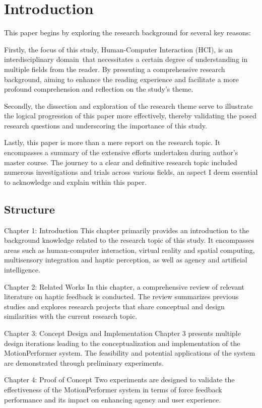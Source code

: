 \chapter{Introduction}
This paper begins by exploring the research background for several key reasons:

Firstly, the focus of this study, Human-Computer Interaction (HCI), is an interdisciplinary domain\cite{paper1}\cite{paper2}\ that necessitates a certain degree of understanding in multiple fields from the reader. By presenting a comprehensive research background, aiming to enhance the reading experience and facilitate a more profound comprehension and reflection on the study's theme.

Secondly, the dissection and exploration of the research theme serve to illustrate the logical progression of this paper more effectively, thereby validating the posed research questions and underscoring the importance of this study.

Lastly, this paper is more than a mere report on the research topic. It encompasses a summary of the extensive efforts undertaken during author's master course. The journey to a clear and definitive research topic included numerous investigations and trials across various fields, an aspect I deem essential to acknowledge and explain within this paper.

\section{Structure}
Chapter 1: Introduction
This chapter primarily provides an introduction to the background knowledge related to the research topic of this study. It encompasses areas such as human-computer interaction, virtual reality and spatial computing, multisensory integration and haptic perception, as well as agency and artificial intelligence.

Chapter 2: Related Works
In this chapter, a comprehensive review of relevant literature on haptic feedback is conducted. The review summarizes previous studies and explores research projects that share conceptual and design similarities with the current research topic.

Chapter 3: Concept Design and Implementation
Chapter 3 presents multiple design iterations leading to the conceptualization and implementation of the MotionPerformer system. The feasibility and potential applications of the system are demonstrated through preliminary experiments.

Chapter 4: Proof of Concept
Two experiments are designed to validate the effectiveness of the MotionPerformer system in terms of force feedback performance and its impact on enhancing agency and user experience.

